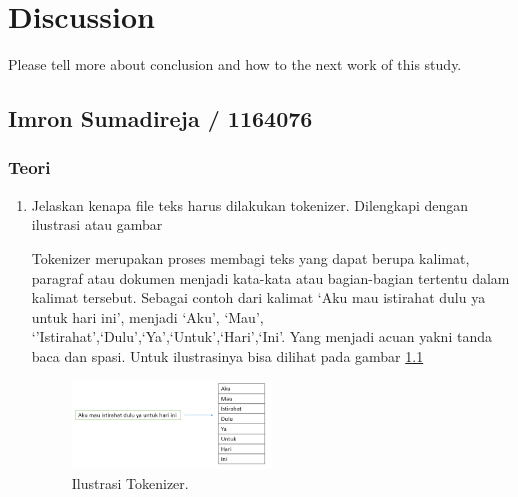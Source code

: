 \chapter{Discussion}
Please tell more about conclusion and how to the next work of this study.

\section{Imron Sumadireja / 1164076}
\subsection{Teori}
\begin{enumerate}
\item Jelaskan kenapa file teks harus dilakukan tokenizer. Dilengkapi dengan ilustrasi atau gambar \par
Tokenizer merupakan proses membagi teks yang dapat berupa kalimat, paragraf atau dokumen menjadi kata-kata atau bagian-bagian tertentu dalam kalimat tersebut. Sebagai contoh dari kalimat `Aku mau istirahat dulu ya untuk hari ini', menjadi `Aku', `Mau', `'Istirahat',`Dulu',`Ya',`Untuk',`Hari',`Ini'. Yang menjadi acuan yakni tanda baca dan spasi. Untuk ilustrasinya bisa dilihat pada gambar \ref{toke1}
		\begin{figure}[!htbp]
		\centerline{\includegraphics[width=0.5\textwidth]{figures/im/toke1.png}}
		\caption{Ilustrasi Tokenizer.}
		\label{toke1}
		\end{figure}


\end{enumerate}
